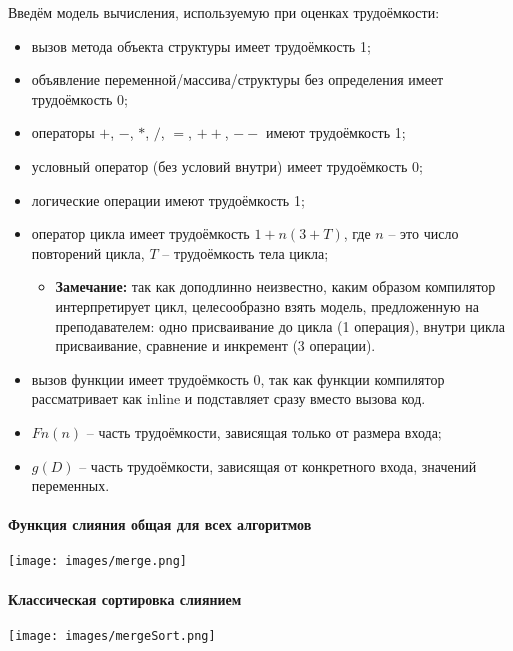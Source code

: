 \documentclass[utf8x, 12pt]{G7-32} %
\begin{document}
Введём модель вычисления, используемую при оценках трудоёмкости:
\begin{itemize}
	\item вызов метода объекта структуры имеет трудоёмкость 1;
	\item объявление переменной/массива/структуры без определения имеет трудоёмкость 0;
	\item операторы $+$, $-$, $*$, $/$, $=$, $++$, $--$ имеют трудоёмкость 1;
	\item условный оператор (без условий внутри) имеет трудоёмкость 0;
	\item логические операции имеют трудоёмкость 1; 
	\item оператор цикла имеет трудоёмкость $1 + n(3 + T)$, где $n$ – это число повторений цикла, $T$ – трудоёмкость тела цикла;
	\begin{itemize}
		\item \textbf{Замечание:} так как доподлинно неизвестно, каким образом компилятор интерпретирует цикл, целесообразно взять модель, предложенную на преподавателем: одно присваивание до цикла (1 операция), внутри цикла присваивание, сравнение и инкремент (3 операции).
	\end{itemize}
	\item вызов функции имеет трудоёмкость 0, так как функции компилятор рассматривает как inline и подставляет сразу вместо вызова код.
	\item $Fn(n)$ – часть трудоёмкости, зависящая только от размера входа;
	\item $g(D)$ – часть трудоёмкости, зависящая от конкретного входа, значений переменных.
\end{itemize}

\newpage

\paragraph{Функция слияния общая для всех алгоритмов}
\begin{center}
	\texttt{[image: images/merge.png]}
\end{center}

\newpage

\paragraph{Классическая сортировка слиянием}
\begin{center}
	\texttt{[image: images/mergeSort.png]}
\end{center}
\end{document}
